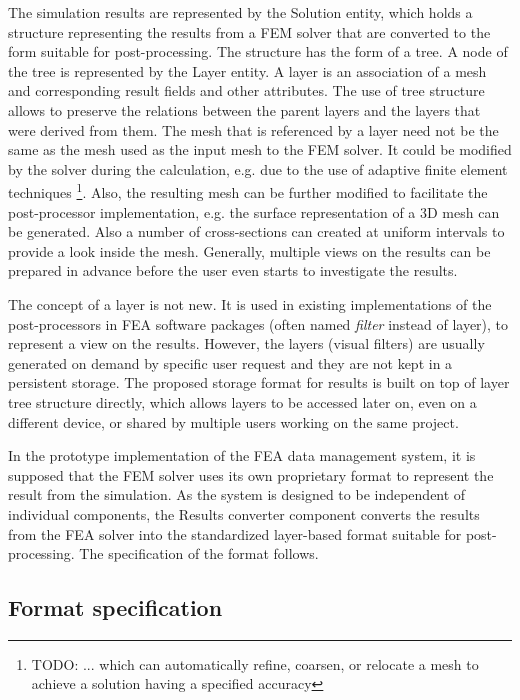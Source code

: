 The simulation results are represented by the Solution entity, which holds a structure representing the results from a FEM solver that are converted to the form suitable for post-processing. The structure has the form of a tree. A node of the tree is represented by the Layer entity. A layer is an association of a mesh and corresponding result fields and other attributes. The use of tree structure allows to preserve the relations between the parent layers and the layers that were derived from them. The mesh that is referenced by a layer need not be the same as the mesh used as the input mesh to the FEM solver. It could be modified by the solver during the calculation, e.g. due to the use of adaptive finite element techniques \footnote{TODO: ... which can automatically refine, coarsen, or relocate a mesh to achieve a solution having a specified accuracy}. Also, the resulting mesh can be further modified to facilitate the post-processor implementation, e.g. the surface representation of a 3D mesh can be generated. Also a number of cross-sections can created at uniform intervals to provide a look inside the mesh. Generally, multiple views on the results can be prepared in advance before the user even starts to investigate the results.

The concept of a layer is not new. It is used in existing implementations of the post-processors in FEA software packages (often named \textit{filter} instead of layer), to represent a view on the results. However, the layers (visual filters) are usually generated on demand by specific user request and they are not kept in a persistent storage. The proposed storage format for results is built on top of layer tree structure directly, which allows layers to be accessed later on, even on a different device, or shared by multiple users working on the same project.

In the prototype implementation of the FEA data management system, it is supposed that the FEM solver uses its own proprietary format to represent the result from the simulation. As the system is designed to be independent of individual components, the Results converter component converts the results from the FEA solver into the standardized layer-based format suitable for post-processing. The specification of the format follows.

\subsection{Format specification}

